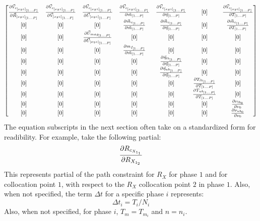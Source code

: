 \begin{equation}
\begin{bmatrix}
\pdv{\vec{V}_{c_{[xyz]_{[1 ... P]}}}}{\vec{R}_{[xyz]_{[1 ... P]}}} &
\pdv{\vec{V}_{c_{[xyz]_{[1 ... P]}}}}{\vec{V}_{[xyz]_{[1 ... P]}}} &
\pdv{\vec{V}_{c_{[xyz]_{[1 ... P]}}}}{\vec{U}_{[xyz]_{[1 ... P]}}} &
\pdv{\vec{V}_{c_{[xyz]_{[1 ... P]}}}}{\vec{m}_{[1 ... P]}} &
\pdv{\vec{V}_{c_{[xyz]_{[1 ... P]}}}}{\vec{\eta}_{[1 ... P]}} &
[0] &
\pdv{\vec{V}_{c_{[xyz]_{[1 ... P]}}}}{T_{[1 ... P]}} \\

[0] &
[0] &
[0] &
\pdv{\vec{m}_{c_{[1 ... P]}}}{\vec{m}_{[1 ... P]}} &
\pdv{\vec{m}_{c_{[1 ... P]}}}{\vec{\eta}_{[1 ... P]}} &
[0] &
\pdv{\vec{m}_{c_{[1 ... P]}}}{T_{[1 ... P]}} \\ 

[0] &
[0] &
\pdv{\vec{U}_{mag_{[1 ... P]}}}{\vec{U}_{[xyz]_{[1 ... P]}}} &
[0] &
[0] &
[0] &
[0]  \\

[0] &
[0] &
[0] &
\pdv{m_{f_{[1 ... P]}}}{\vec{m}_{[1 ... P]}} &
[0] &
[0] &
[0]  \\

[0] &
[0] &
[0] &
[0] &
\pdv{\vec{\eta}_{lb_{[1 ... P]}}}{\vec{\eta}_{[1 ... P]}} &
[0] &
[0]  \\

[0] &
[0] &
[0] &
[0] &
\pdv{\vec{\eta}_{ub_{[1 ... P]}}}{\vec{\eta}_{[1 ... P]}} &
[0] &
[0]  \\

[0] &
[0] &
[0] &
[0] &
[0] &
\pdv{T_{lb_{[1 ... P]}}}{T_{[1 ... P]}} &
[0]  \\

[0] &
[0] &
[0] &
[0] &
[0] &
\pdv{T_{ub_{[1 ... P]}}}{T_{[1 ... P]}} &
[0]  \\

[0] &
[0] &
[0] &
[0] &
[0] &
[0] &
\pdv{\nu_{lb_0}}{\nu_0} \\

[0] &
[0] &
[0] &
[0] &
[0] &
[0] &
\pdv{\nu_{ub_0}}{\nu_0} \\

\end{bmatrix}
\end{equation}
The equation subscripts in the next section often take on a standardized form for readibility. For example, take the following partial:
\begin{equation}
\pdv{R_{c_{X_{1_{1}}}}}{R_{X_{1_{2}}}}
\end{equation}
This represents partial of the path constraint for $R_X$ for phase $1$ and for collocation point $1$, with respect to the $R_X$ collocation point $2$ in phase $1$. Also, when not specified, the term $\Delta t$ for a specific phase $i$ represents:
\begin{equation}
\Delta t_i = T_i / N_i
\end{equation}
Also, when not specified, for phase $i$, $T_m = T_{m_i}$ and $n = n_i$.

